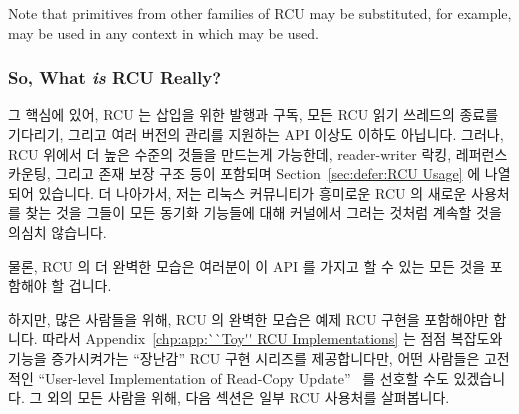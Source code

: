 Note that primitives from other families of RCU may be substituted,
for example,  may be used in any context
in which  may be used.

\fi

\subsubsection{So, What \emph{is} RCU Really?}
\label{sec:defer:So, What is RCU Really?}

그 핵심에 있어, RCU 는 삽입을 위한 발행과 구독, 모든 RCU 읽기 쓰레드의 종료를
기다리기, 그리고 여러 버전의 관리를 지원하는 API 이상도 이하도 아닙니다.
그러나, RCU 위에서 더 높은 수준의 것들을 만드는게 가능한데, reader-writer 락킹,
레퍼런스 카운팅, 그리고 존재 보장 구조 등이 포함되며
Section~\ref{sec:defer:RCU Usage} 에 나열되어 있습니다.
더 나아가서, 저는 리눅스 커뮤니티가 흥미로운 RCU 의 새로운 사용처를 찾는 것을
그들이 모든 동기화 기능들에 대해 커널에서 그러는 것처럼 계속할 것을 의심치
않습니다.

물론, RCU 의 더 완벽한 모습은 여러분이 이 API 를 가지고 할 수 있는 모든 것을
포함해야 할 겁니다.

하지만, 많은 사람들을 위해, RCU 의 완벽한 모습은 예제 RCU 구현을 포함해야만
합니다.
따라서
Appendix~\ref{chp:app:``Toy'' RCU Implementations}
는 점점 복잡도와 기능을 증가시켜가는 ``장난감'' RCU 구현 시리즈를 제공합니다만,
어떤 사람들은 고전적인 ``User-level Implementation of Read-Copy
Update''~\cite{MathieuDesnoyers2012URCU} 를 선호할 수도 있겠습니다.
그 외의 모든 사람을 위해, 다음 섹션은 일부 RCU 사용처를 살펴봅니다.

